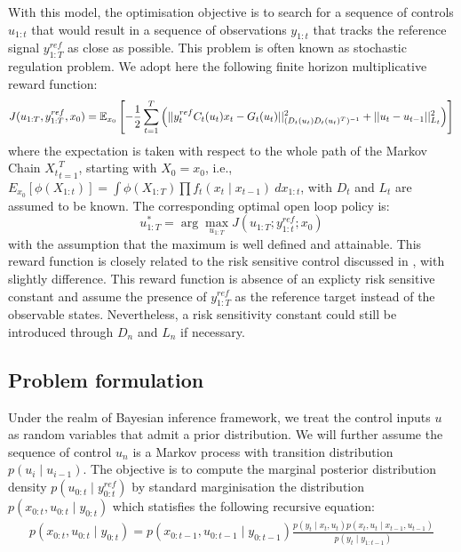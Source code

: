 With this model, the optimisation objective is to search for a sequence of controls $u_{1:t}$ that would result in a sequence of observations $y_{1:t}$ that tracks the reference signal $y^{ref}_{1:T}$ as close as possible. This problem is often known as stochastic regulation problem. We adopt here the following finite horizon multiplicative reward function:
\begin{equation}
  J(u_{1:T},y^{ref}_{1:T}, x_0) = \operatorname{\mathbb{E}}_{x_0}\left[ -\dfrac{1}{2}\displaystyle\sum^T_{t=1}\left(\vert\vert y^{ref}_t C_t(u_t)x_t - G_t(u_t) \vert\vert^2_{(D_t(u_t)D_t(u_t)^T)^{-1}}  + \vert\vert u_t - u_{t-1} \vert\vert^2_{L_t}\right) \right]
\end{equation}
where the expectation is taken with respect to the whole path of the Markov Chain ${X_t}^T_{t=1}$, starting with $X_0 = x_0$,  i.e., $E_{x_0}[\phi(X_{1:t})] = \int \phi(X_{1:T}) \prod f_t(x_t \mid x_{t-1})~dx_{1:t}$, with $D_t$ and $L_t$ are assumed to be known. The corresponding optimal open loop policy is:
\begin{equation}
  u^*_{1:T} = \arg\max_{u_{1:T}} J(u_{1:T};y^{ref}_{1:t};x_0)
\label{eq:optcontrol}
\end{equation}
with the assumption that the maximum is well defined and attainable. This reward function is closely related to the risk sensitive control discussed in \cite{WR90}, with slightly difference. This reward function is absence of an explicty risk sensitive constant and assume the presence of $y^{ref}_{1:T}$ as the reference target instead of the observable states. Nevertheless, a risk sensitivity constant could still be introduced through $D_n$ and $L_n$ if necessary.
 
\subsection{Problem formulation}
Under the realm of Bayesian inference framework, we treat the control inputs $u$ as random variables that admit a prior distribution. We will further assume the sequence of control $u_n$ is a Markov process with transition distribution $p(u_i \mid u_{i-1})$. The objective is to compute the marginal posterior distribution density $p(u_{0:t} \mid y^{ref}_{0:t})$ by standard marginisation the distribution $p(x_{0:t}, u_{0:t} \mid y_{0:t})$ which statisfies the following recursive equation:
\begin{align}
  p(x_{0:t}, u_{0:t} \mid y_{0:t}) = p(x_{0:t-1}, u_{0:t-1} \mid y_{0:t-1}) \frac{p(y_t \mid x_t, u_t)p(x_t, u_t \mid x_{t-1}, u_{t-1})}{p(y_t \mid y_{1:t-1})}
\end{align}
 
